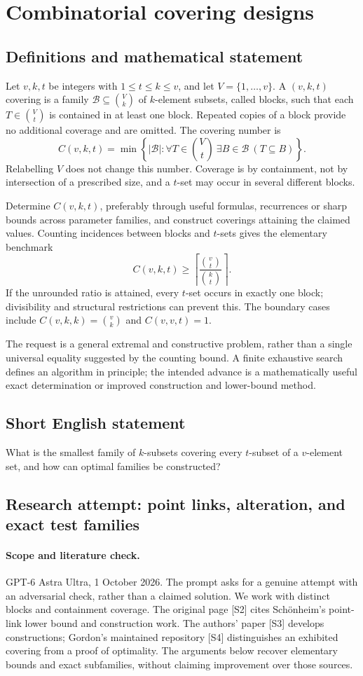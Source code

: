 \documentclass[11pt,a4paper]{article}
\begin{document}
\section*{Combinatorial covering designs}\label{statement}

\subsection{Definitions and mathematical statement}
Let $v,k,t$ be integers with $1\le t\le k\le v$, and let
$V=\{1,\ldots,v\}$. A $(v,k,t)$ covering is a family
$\mathcal B\subseteq\binom Vk$ of $k$-element subsets, called blocks,
such that each $T\in\binom Vt$ is contained in at least one block.
Repeated copies of a block provide no additional coverage and are omitted.
The covering number is
\[
 C(v,k,t)=\min\left\{|\mathcal B|:
 \forall T\in\binom Vt\ \exists B\in\mathcal B\ (T\subseteq B)\right\}.
\]
Relabelling $V$ does not change this number. Coverage is by containment,
not by intersection of a prescribed size, and a $t$-set may occur in
several different blocks.

Determine $C(v,k,t)$, preferably through useful formulas, recurrences or
sharp bounds across parameter families, and construct coverings attaining
the claimed values. Counting incidences between blocks and $t$-sets gives
the elementary benchmark
\[
 C(v,k,t)\ge
 \left\lceil\frac{\binom vt}{\binom kt}\right\rceil.
\]
If the unrounded ratio is attained, every $t$-set occurs in exactly one
block; divisibility and structural restrictions can prevent this.
The boundary cases include $C(v,k,k)=\binom vk$ and $C(v,v,t)=1$.

The request is a general extremal and constructive problem, rather than
a single universal equality suggested by the counting bound. A finite
exhaustive search defines an algorithm in principle; the intended advance
is a mathematically useful exact determination or improved construction
and lower-bound method.
\subsection{Short English statement}
What is the smallest family of $k$-subsets covering every $t$-subset of a $v$-element set, and how can optimal families be constructed?
\subsection{Research attempt: point links, alteration, and exact test families}
\paragraph{Scope and literature check.}
GPT-6 Astra Ultra, 1 October 2026. The prompt asks for a genuine attempt
with an adversarial check, rather than a claimed solution. We work with
distinct blocks and containment coverage. The original page [S2] cites
Schönheim's point-link lower bound and construction work. The authors'
paper [S3] develops constructions; Gordon's maintained repository [S4]
distinguishes an exhibited covering from a proof of optimality. The
arguments below recover elementary bounds and exact subfamilies, without
claiming improvement over those sources.
\end{document}
